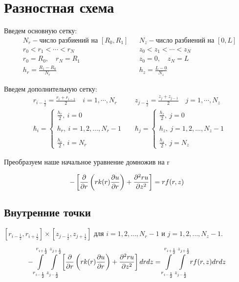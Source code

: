 \section{Разностная схема}
Введем основную сетку:
\begin{align*}
  &N_r - \text{число разбиений на } [R_0, R_1] & &N_z - \text{число разбиений на } [0, L] \\
  &r_0 < r_1 < \cdots < r_N & &z_0 < z_1 < \cdots < z_N \\
  &r_0 = R_0,\quad r_N = R_1 & &z_0 = 0,\quad z_N = L \\
  &h_r = \frac{R_1 - R_0}{N_r} & &h_z = \frac{L - 0}{N_z}
\end{align*}

Введем дополнительную сетку:
\begin{align*}
  &r_{i-\frac{1}{2}} = \frac{r_i + r_{i - 1}}{2}\quad i=1,\cdots, N_r & &z_{j-\frac{1}{2}} = \frac{z_j + z_{j - 1}}{2}\quad j=1,\cdots, N_z \\
  & \hbar_i = \begin{cases}
    \frac{h_r}{2},\ i = 0 \\ \\
    h_r,\ i = 1, 2, \dots, N_r-1 \\ \\
    \frac{h_r}{2},\ i = N_r
  \end{cases} &
  & \hbar_j = \begin{cases}
    \frac{h_z}{2},\ j = 0 \\ \\
    h_z,\ j = 1, 2, \dots, N_z-1 \\ \\
    \frac{h_z}{2},\ j = N_z
  \end{cases}
\end{align*}

Преобразуем наше начальное уравнение домножив на r

\[
  - \left [ \pdv{}{r} \left ( r k(r) \pdv{u}{r} \right ) 
  + \pdv[2]{ru}{z} \right ] = rf(r, z)
\]

\subsection{Внутренние точки}
$ [r_{i -\frac{1}{2}}, r_{i +\frac{1}{2}}] \times  [z_{j -\frac{1}{2}}, z_{j +\frac{1}{2}}] $
для $ i = 1, 2, \dots, N_r - 1 $ и $ j = 1, 2, \dots, N_z - 1$.

\[
  - \int\limits^{r_{i +\frac{1}{2}}}_{r_{i -\frac{1}{2}}} \int\limits^{z_{j +\frac{1}{2}}}_{z_{j -\frac{1}{2}}} \left [ \pdv{}{r} \left ( r k(r) \pdv{u}{r} \right ) 
  + \pdv[2]{ru}{z} \right ] dr dz = \int\limits^{r_{i +\frac{1}{2}}}_{r_{i -\frac{1}{2}}} \int\limits^{z_{j +\frac{1}{2}}}_{z_{j -\frac{1}{2}}} rf(r, z) dr dz
\]

